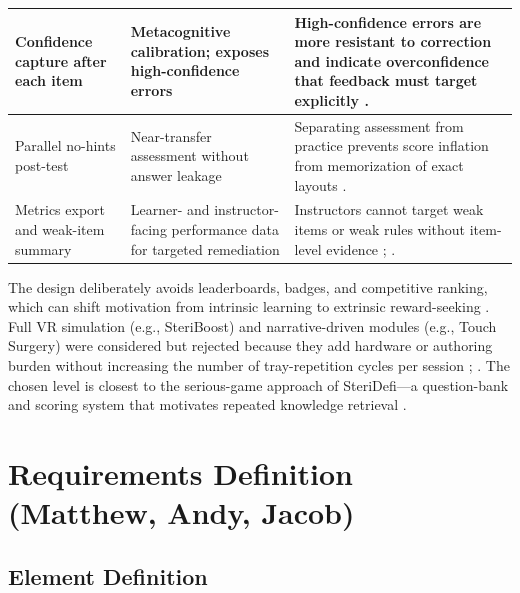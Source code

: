 \documentclass[10pt,a4paper]{article}
\begin{document}
\begin{table}[H]
\begin{tabularx}{\textwidth}{|>{\raggedright\arraybackslash}X|>{\raggedright\arraybackslash}X|>{\raggedright\arraybackslash}X|}
\hline
Confidence capture after each item & Metacognitive calibration; exposes high-confidence errors & High-confidence errors are more resistant to correction and indicate overconfidence that feedback must target explicitly \cite{ofstead-et-al-2023}. \\
\hline
Parallel no-hints post-test & Near-transfer assessment without answer leakage & Separating assessment from practice prevents score inflation from memorization of exact layouts \cite{bell-et-al-2008}. \\
\hline
Metrics export and weak-item summary & Learner- and instructor-facing performance data for targeted remediation & Instructors cannot target weak items or weak rules without item-level evidence \cite{kovach-2012}; \cite{nichol-et-al-2024}. \\
\hline
\end{tabularx}
\end{table}

The design deliberately avoids leaderboards, badges, and competitive
ranking, which can shift motivation from intrinsic learning to extrinsic
reward-seeking \cite{van-gaalen-et-al-2021}.
Full VR simulation (e.g., SteriBoost) and narrative-driven modules (e.g.,
Touch Surgery) were considered but rejected because they add hardware or
authoring burden without increasing the number of tray-repetition cycles per
session
\cite{steriboost-accessed-2026};
\cite{tulipan-et-al-2019}.
The chosen level is closest to the serious-game approach of SteriDefi---a
question-bank and scoring system that motivates repeated knowledge retrieval
\cite{vanhaverbeke-et-al-2018}.



\section{Requirements Definition \hfill {\normalfont\small (Matthew, Andy, Jacob)}}
\label{sec:requirements-definition}
\subsection{Element Definition}
\end{document}
